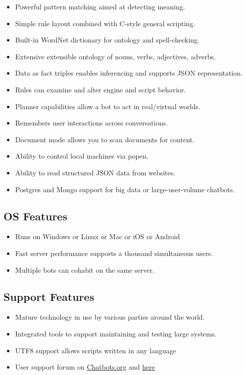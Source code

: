 \documentclass[]{article}
\providecommand{\tightlist}{%
  \setlength{\itemsep}{0pt}\setlength{\parskip}{0pt}}
\begin{document}
\begin{itemize}
\tightlist
\item
  Powerful pattern matching aimed at detecting meaning.
\item
  Simple rule layout combined with C-style general scripting.
\item
  Built-in WordNet dictionary for ontology and spell-checking.
\item
  Extensive extensible ontology of nouns, verbs, adjectives, adverbs.
\item
  Data as fact triples enables inferencing and supports JSON
  representation.
\item
  Rules can examine and alter engine and script behavior.
\item
  Planner capabilities allow a bot to act in real/virtual worlds.
\item
  Remembers user interactions across conversations.
\item
  Document mode allows you to scan documents for content.
\item
  Ability to control local machines via popen.
\item
  Ability to read structured JSON data from websites.
\item
  Postgres and Mongo support for big data or large-user-volume chatbots.
\end{itemize}

\subsection{OS Features}\label{os-features}

\begin{itemize}
\tightlist
\item
  Runs on Windows or Linux or Mac or iOS or Android
\item
  Fast server performance supports a thousand simultaneous users.
\item
  Multiple bots can cohabit on the same server.
\end{itemize}

\subsection{Support Features}\label{support-features}

\begin{itemize}
\tightlist
\item
  Mature technology in use by various parties around the world.
\item
  Integrated tools to support maintaining and testing large systems.
\item
  UTF8 support allows scripts written in any language
\item
  User support forum on
  \href{https://www.chatbots.org/ai_zone/viewforum/44/}{Chatbots.org}
  and \href{https://github.com/bwilcox-1234/ChatScript/issues}{here}
\end{itemize}
\end{document}
